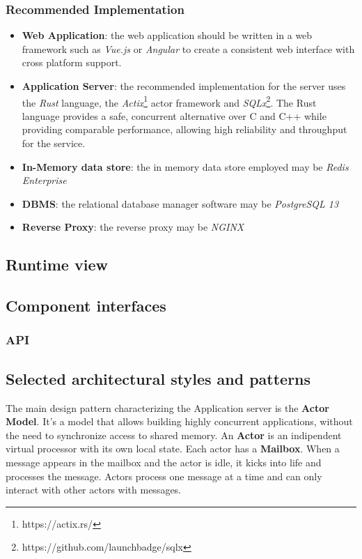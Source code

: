 \subsubsection*{Recommended Implementation}
\begin{itemize}
    \item \textbf{Web Application}: the web application should be written in a web framework such as \emph{Vue.js} or \emph{Angular} to create a consistent web interface with cross platform support.
    \item \textbf{Application Server}: the recommended implementation for the server uses the \emph{Rust} language, the \emph{Actix}\footnote{https://actix.rs/} actor framework and \emph{SQLx}\footnote{https://github.com/launchbadge/sqlx}. The Rust language provides a safe, concurrent alternative over C and C++ while providing comparable performance, allowing high reliability and throughput for the service.
    \item \textbf{In-Memory data store}: the in memory data store employed may be \emph{Redis Enterprise}
    \item \textbf{DBMS}: the relational database manager software may be \emph{PostgreSQL 13}
    \item \textbf{Reverse Proxy}: the reverse proxy may be \emph{NGINX}
\end{itemize}

\subsection{Runtime view}

\subsection{Component interfaces}

\label{sect:api}
\subsubsection{API}
\todo{
    
}
\label{sect:patterns}
\subsection{Selected architectural styles and patterns}
The main design pattern characterizing the Application server is the \textbf{Actor Model}\cite{10.5555/1624775.1624804}. It's a model that allows building highly concurrent applications, without the need to synchronize access to shared memory.
An \textbf{Actor} is an indipendent virtual processor with its own local state. Each actor has a \textbf{Mailbox}. When a message appears in the mailbox and the actor is idle, it kicks into life and processes the message\cite{pragmatic}. Actors process one message at a time and can only interact with other actors with messages.

